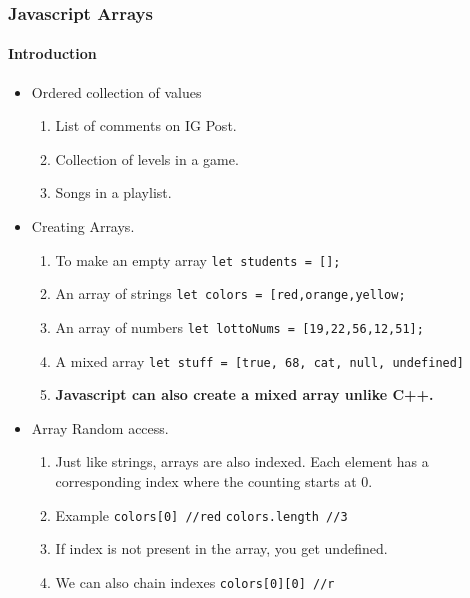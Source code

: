 \documentclass[
  paper=a4,
  ,captions=tableheading
]{scrartcl}
\providecommand{\tightlist}{%
  \setlength{\itemsep}{0pt}\setlength{\parskip}{0pt}}
\begin{document}
\hypertarget{javascript-arrays}{%
\subsubsection{Javascript Arrays}\label{javascript-arrays}}

\hypertarget{introduction}{%
\paragraph{Introduction}\label{introduction}}

\begin{itemize}
\tightlist
\item
  Ordered collection of values

  \begin{enumerate}
  \def\labelenumi{\arabic{enumi}.}
  \tightlist
  \item
    List of comments on IG Post.
  \item
    Collection of levels in a game.
  \item
    Songs in a playlist.
  \end{enumerate}
\item
  Creating Arrays.

  \begin{enumerate}
  \def\labelenumi{\arabic{enumi}.}
  \tightlist
  \item
    To make an empty array \texttt{let\ students\ =\ {[}{]};}
  \item
    An array of strings
    \texttt{let\ colors\ =\ {[}\textquotesingle{}red\textquotesingle{},\textquotesingle{}orange\textquotesingle{},\textquotesingle{}yellow\textquotesingle{}{]};}
  \item
    An array of numbers
    \texttt{let\ lottoNums\ =\ {[}19,22,56,12,51{]};}
  \item
    A mixed array
    \texttt{let\ stuff\ =\ {[}true,\ 68,\ \textquotesingle{}cat\textquotesingle{},\ null,\ undefined{]}}
  \item
    \textbf{Javascript can also create a mixed array unlike C++.}
  \end{enumerate}
\item
  Array Random access.

  \begin{enumerate}
  \def\labelenumi{\arabic{enumi}.}
  \tightlist
  \item
    Just like strings, arrays are also indexed. Each element has a
    corresponding index where the counting starts at 0.
  \item
    Example \texttt{colors{[}0{]}\ //red} \texttt{colors.length\ //3}
  \item
    If index is not present in the array, you get undefined.
  \item
    We can also chain indexes \texttt{colors{[}0{]}{[}0{]}\ //r}
  \end{enumerate}
\end{itemize}
\end{document}
